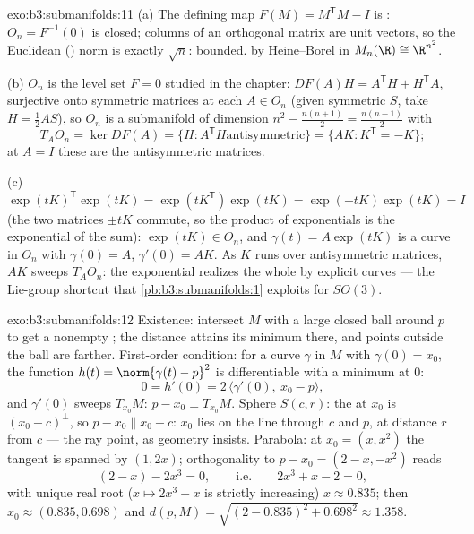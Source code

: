 \begin{solution}{exo:b3:submanifolds:11}
(a) The defining map $F(M) = M^{\mathsf T}M - I$ is
: $O_n = F^{-1}(0)$ is closed; columns of an
orthogonal matrix are unit vectors, so the Euclidean
() norm is exactly $\sqrt n$: bounded.  by
Heine--Borel in $M_n(\R) \cong \R^{n^2}$.

(b) $O_n$ is the level set $F = 0$ studied in the chapter:
$DF(A)H = A^{\mathsf T}H + H^{\mathsf T}A$, surjective onto
symmetric matrices at each $A \in O_n$ (given symmetric $S$,
take $H = \frac12AS$), so $O_n$ is a submanifold of
dimension $n^2 - \frac{n(n+1)}2 = \frac{n(n-1)}2$ with
\[
T_AO_n = \ker DF(A) = \{H : A^{\mathsf T}H \text{
antisymmetric}\} = \{AK : K^{\mathsf T} = -K\} ;
\]
at $A = I$ these are the antisymmetric matrices.

(c) $\exp(tK)^{\mathsf T}\exp(tK) = \exp(tK^{\mathsf T})
\exp(tK) = \exp(-tK)\exp(tK) = I$ (the two matrices $\pm tK$
commute, so the product of exponentials is the exponential
of the sum): $\exp(tK) \in O_n$, and $\gamma(t) =
A\exp(tK)$ is a curve in $O_n$ with $\gamma(0) = A$,
$\gamma'(0) = AK$. As $K$ runs over antisymmetric matrices,
$AK$ sweeps $T_AO_n$: the exponential realizes the whole
 by explicit curves --- the Lie-group shortcut
that \cref{pb:b3:submanifolds:1} exploits for $SO(3)$.
\end{solution}

\begin{solution}{exo:b3:submanifolds:12}
Existence: intersect $M$ with a large closed ball around
$p$ to get a nonempty ; the  distance
attains its minimum there, and points outside the ball are
farther. First-order condition: for a curve $\gamma$ in $M$
with $\gamma(0) = x_0$, the function $h(t) = \norm{\gamma(t)
- p}^2$ is differentiable with a minimum at $0$:
\[
0 = h'(0) = 2\,\langle\gamma'(0),\ x_0 - p\rangle,
\]
and $\gamma'(0)$ sweeps $T_{x_0}M$: $p - x_0 \perp
T_{x_0}M$. Sphere $S(c, r)$: the  at $x_0$ is
$(x_0 - c)^\perp$, so $p - x_0 \parallel x_0 - c$: $x_0$
lies on the line through $c$ and $p$, at distance $r$ from
$c$ --- the ray point, as geometry insists. Parabola: at
$x_0 = (x, x^2)$ the tangent is spanned by $(1, 2x)$;
orthogonality to $p - x_0 = (2 - x, -x^2)$ reads
\[
(2 - x) - 2x^3 = 0,
\qquad\text{i.e.}\qquad 2x^3 + x - 2 = 0,
\]
with unique real root ($x \mapsto 2x^3 + x$ is strictly
increasing) $x \approx 0.835$; then $x_0 \approx (0.835,
0.698)$ and $d(p, M) = \sqrt{(2 - 0.835)^2 + 0.698^2}
\approx 1.358$.
\end{solution}


